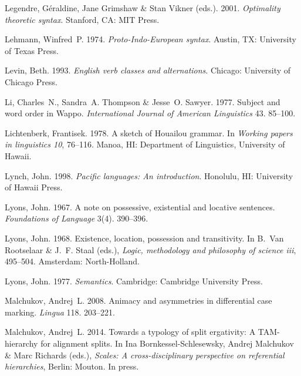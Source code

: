 \documentclass[ number=1
			   ,series=sidl
				,url=http://langsci-press.org/catalog/book/18 
			   ,isbn=978-3-944675-19-0
			   ,output=long   %
			  ]{LSP/langsci}
\begin{document}
\begin{thebibliography}{190}
Legendre, G{\'e}raldine, Jane Grimshaw \& Stan Vikner (eds.). 2001.
\newblock \emph{Optimality theoretic syntax}.
\newblock Stanford, CA: MIT Press.
\enlargethispage{\baselineskip}


Lehmann, Winfred~P. 1974.
\newblock \emph{Proto-{I}ndo-{E}uropean syntax}.
\newblock Austin, TX: University of Texas Press.

Levin, Beth. 1993.
\newblock \emph{English verb classes and alternations}.
\newblock Chicago: University of Chicago Press.

Li, {\relax Ch}arles~N., Sandra~A. Thompson \& Jesse~O. Sawyer. 1977.
\newblock Subject and word order in {W}appo.
\newblock \emph{International Journal of American Linguistics} 43. 85--100.

Lichtenberk, Frantisek. 1978.
\newblock A sketch of {H}ouailou grammar.
\newblock In \emph{Working papers in linguistics 10}, 76--116. Manoa, HI:
  Department of Linguistics, University of Hawaii.

Lynch, John. 1998.
\newblock \emph{Pacific languages: {A}n introduction}.
\newblock Honolulu, HI: University of Hawaii Press.

Lyons, John. 1967.
\newblock A note on possessive, existential and locative sentences.
\newblock \emph{Foundations of Language} 3(4). 390--396.

Lyons, John. 1968.
\newblock Existence, location, possession and transitivity.
\newblock In B.~Van Rootselaar \& J.~F. Staal (eds.), \emph{Logic, methodology
  and philosophy of science iii}, 495--504. Amsterdam: North-Holland.

Lyons, John. 1977.
\newblock \emph{Semantics}.
\newblock Cambridge: Cambridge University Press.

Malchukov, Andrej~L. 2008.
\newblock Animacy and asymmetries in differential case marking.
\newblock \emph{Lingua} 118. 203--221.

Malchukov, Andrej~L. 2014.
\newblock Towards a typology of split ergativity: {A} {TAM}-hierarchy for
  alignment splits.
\newblock In Ina Bornkessel-Schlesewsky, Andrej Malchukov \& Marc Richards
  (eds.), \emph{Scales: {A} cross-disciplinary perspective on referential
  hierarchies}, Berlin: Mouton.
\newblock In press.


\end{thebibliography}
\end{document}
